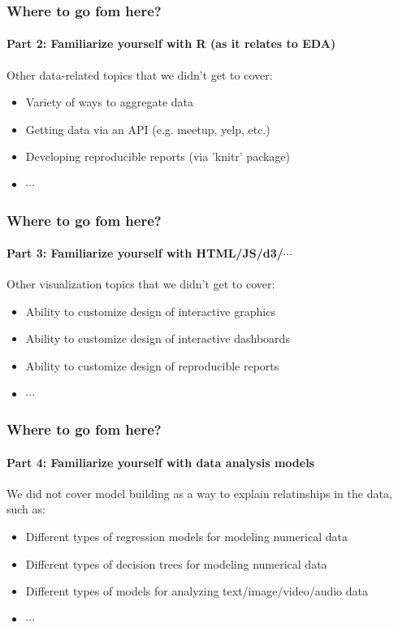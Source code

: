 \begin{frame}
  \frametitle{Where to go fom here?}
  \framesubtitle{Part 2: Familiarize yourself with R (as it relates to EDA)}

  Other data-related topics that we didn't get to cover:
  \begin{itemize}
    \item Variety of ways to aggregate data
    \item Getting data via an API (e.g. meetup, yelp, etc.)
    \item Developing reproducible reports (via 'knitr' package)    
    \item $\cdots$
  \end{itemize}
\end{frame}

\begin{frame}
  \frametitle{Where to go fom here?}
  \framesubtitle{Part 3: Familiarize yourself with HTML/JS/d3/$\cdots$}

  Other visualization topics that we didn't get to cover:
  \begin{itemize}
    \item Ability to customize design of interactive graphics
    \item Ability to customize design of interactive dashboards
    \item Ability to customize design of reproducible reports   
    \item $\cdots$
  \end{itemize}
\end{frame}

\begin{frame}
  \frametitle{Where to go fom here?}
  \framesubtitle{Part 4: Familiarize yourself with data analysis models}

  We did not cover model building as a way to explain relatinships in the data, such as:
  \begin{itemize}
    \item Different types of regression models for modeling numerical data
    \item Different types of decision trees for modeling numerical data
    \item Different types of models for analyzing text/image/video/audio data   
    \item $\cdots$
  \end{itemize}
\end{frame}

